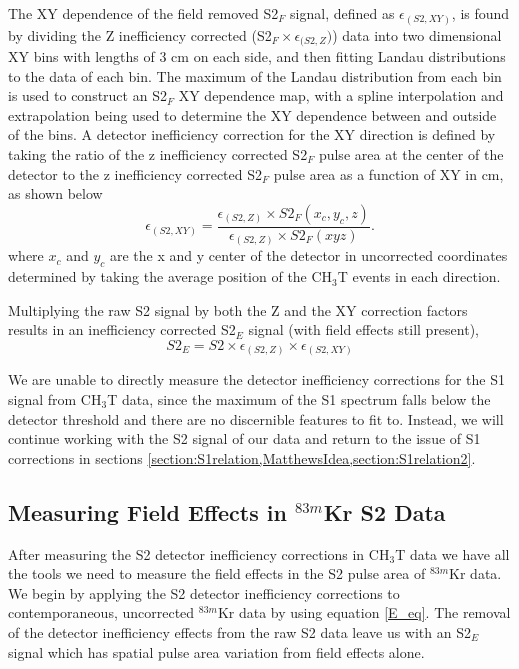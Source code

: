 The XY dependence of the field removed S2$_F$ signal, defined as $\epsilon_{(S2,XY)}$, is found by dividing the Z inefficiency corrected (S2$_F \times \epsilon_{(S2,Z})$) data into two dimensional XY bins with lengths of 3 cm on each side, and then fitting Landau distributions to the data of each bin.  The maximum of the Landau distribution from each bin is used to construct an S2$_F$ XY dependence map, with a spline interpolation and extrapolation being used to determine the XY dependence between and outside of the bins.  A detector inefficiency correction for the XY direction is defined by taking the ratio of the z inefficiency corrected S2$_F$ pulse area at the center of the detector to the z inefficiency corrected S2$_F$ pulse area as a function of XY in cm, as shown below
\begin{equation}
\epsilon_{(S2,XY)} = \frac{\epsilon_{(S2,Z)} \times S2_F(x_c,y_c,z)} { \epsilon_{(S2,Z)} \times S2_F(xyz)}.
\end{equation} 
where $x_c$ and $y_c$ are the x and y center of the detector in uncorrected coordinates determined by taking the average position of the CH$_3$T events in each direction.



Multiplying the raw S2 signal by both the Z and the XY correction factors results in an inefficiency corrected S2$_E$ signal (with field effects still present), 
\begin{equation}\label{E_eq}
S2_E =S2 \times \epsilon_{(S2,Z)} \times \epsilon_{(S2,XY)} 
\end{equation}

We are unable to directly measure the detector inefficiency corrections for the S1 signal from CH$_3$T data, since the maximum of the S1 spectrum falls below the detector threshold and there are no discernible features to fit to. Instead, we will continue working with the S2 signal of our data and return to the issue of S1 corrections in sections \ref{section:S1relation,MatthewsIdea,section:S1relation2}.


 
\subsection{Measuring Field Effects in $^{83m}$Kr S2 Data} \label{section:FieldEffects}

After measuring the S2 detector inefficiency corrections in CH$_3$T data we have all the tools we need to measure the field effects in the S2 pulse area of $^{83m}$Kr data.  We begin by applying the S2 detector inefficiency corrections to contemporaneous,  uncorrected $^{83m}$Kr data by using equation \ref{E_eq}.  The removal of the detector inefficiency effects from the raw S2 data leave us with an S2$_E$ signal which has spatial pulse area variation from field effects alone.

